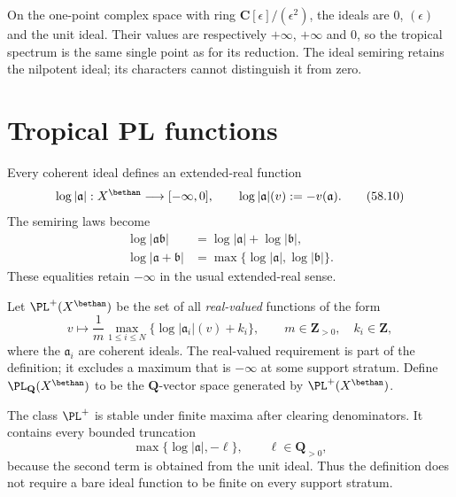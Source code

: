 \begin{example}
\label{ex:ts-dual-numbers}
On the one-point complex space with ring
$\mathbf C[\epsilon]/(\epsilon^2)$, the ideals are $0$, $(\epsilon)$
and the unit ideal. Their values are respectively $+\infty$, $+\infty$
and $0$, so the tropical spectrum is the same single point as for its
reduction. The ideal semiring retains the nilpotent ideal; its characters
cannot distinguish it from zero.
\end{example}

\section{Tropical PL functions}
\label{sec:ts-pl}

Every coherent ideal defines an extended-real function
\[
 \log|\mathfrak a|:X^\bethan\longrightarrow[-\infty,0],
 \qquad
 \log|\mathfrak a|(v):=-v(\mathfrak a).
\tag{58.10}\label{eq:ts-ideal-function}
\]
The semiring laws become
\[
\begin{aligned}
 \log|\mathfrak a\mathfrak b|
      &=\log|\mathfrak a|+\log|\mathfrak b|,\\
 \log|\mathfrak a+\mathfrak b|
      &=\max\{\log|\mathfrak a|,\log|\mathfrak b|\}.
\end{aligned}
\tag{58.11}\label{eq:ts-ideal-function-laws}
\]
These equalities retain $-\infty$ in the usual extended-real sense.

\begin{samepage}
\begin{definition}
\label{def:ts-pl-lattice}
Let $\PL^+(X^\bethan)$ be the set of all \emph{real-valued} functions
of the form
\[
 v\longmapsto
 \frac1m\max_{1\leq i\leq N}
       \{\log|\mathfrak a_i|(v)+k_i\},
 \qquad
 m\in\mathbf Z_{>0},\quad k_i\in\mathbf Z,
\tag{58.12}\label{eq:ts-pl-positive}
\]
where the $\mathfrak a_i$ are coherent ideals.  The real-valued
requirement is part of the definition; it excludes a maximum that is
$-\infty$ at some support stratum.  Define
$\PL_{\mathbf Q}(X^\bethan)$ to be the
$\mathbf Q$-vector space generated by $\PL^+(X^\bethan)$.
\end{definition}
\end{samepage}

The class $\PL^+$ is stable under finite maxima after clearing
denominators.  It contains every bounded truncation
\[
          \max\{\log|\mathfrak a|,-\ell\},
          \qquad \ell\in\mathbf Q_{>0},
\tag{58.13}\label{eq:ts-ideal-truncation}
\]
because the second term is obtained from the unit ideal.  Thus the
definition does not require a bare ideal function to be finite on every
support stratum.

